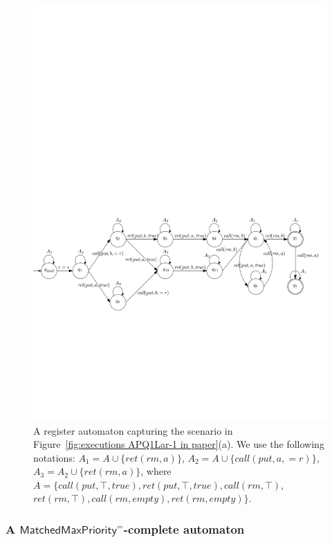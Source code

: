 \documentclass[a4paper,UKenglish]{lipics-v2016}
\begin{document}
\begin{figure}[t]
  \centering
  \includegraphics[width=.9\textwidth]{PIC_AUTO_PQ1Lar-pprr.pdf}
  \caption{A register automaton capturing the scenario in Figure~\ref{fig:executions APQ1Lar-1 in paper}(a). We use the following notations: $A_1 = A \cup \{ \textit{ret}(\textit{rm},a) \}$, $A_2 = A \cup \{ \textit{call}(\textit{put},a,=r) \}$, $A_3 = A_2 \cup \{ \textit{ret}(\textit{rm},a) \}$, where $A = \{ \textit{call}(\textit{put},\top,\textit{true}),\textit{ret}(\textit{put},\top,\textit{true}), \textit{call}(\textit{rm},\top)$, $\textit{ret}(\textit{rm},\top),\textit{call}(\textit{rm},\textit{empty}),\textit{ret}(\textit{rm},\textit{empty}) \}$.}
  \label{fig:automata APQ1Lar-1 in paper}
\end{figure}







\subsubsection{A $\mathsf{MatchedMaxPriority}^=$-complete automaton}
\label{subsec:co-regular of EPQ1Equal}
\end{document}
